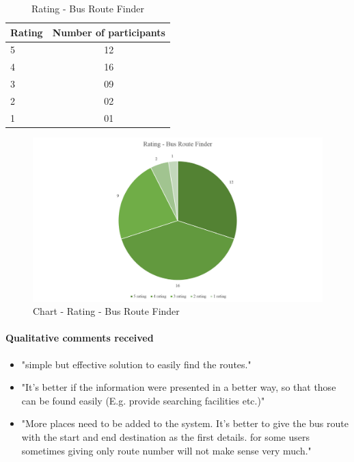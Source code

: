 \begin{table} [H]
\centering
\begin{tabular}{|l|c|}
\hline
Rating & Number of participants \\
\hline
5	&12 \\
4	&16 \\
3	&09 \\
2	&02 \\
1	&01 \\
\hline
\end{tabular}
\caption{Rating - Bus Route Finder}
\label{table-survey-rating-BusRouteFinder}
\end{table}

\begin {figure} [H]
\centering
\includegraphics [scale=0.7] {ratingBusRouteFinder}
\caption [Chart - Rating - Bus Route Finder] {Chart - Rating - Bus Route Finder}
\label {image-ratingBusRouteFinder}
\end {figure}

\paragraph{Qualitative comments received}
\begin {itemize}
\item "simple but effective solution to easily find the routes."
\item "It's better if the information were presented in a better way, so that those can be found easily (E.g. provide searching facilities etc.)"
\item "More places need to be added to the system. It's better to give the bus route with the start and end destination as the first details. for some users sometimes giving only route number will not make sense very much."
\end {itemize}



